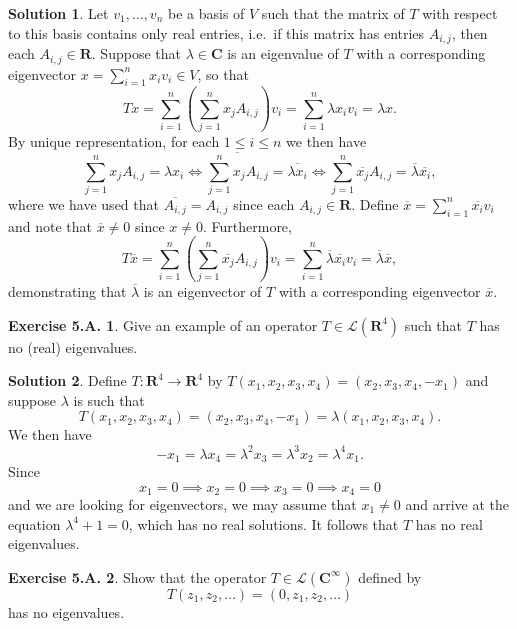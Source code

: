 \documentclass[12pt]{article}
\theoremstyle{definition}
\theoremstyle{exercise}
\newtheorem{exercise}{Exercise 5.A.}
\theoremstyle{solution}
\newtheorem*{solution}{Solution}
\newcommand{\lmap}{\mathcal{L}}
\newcommand{\R}{\mathbf{R}}
\newcommand{\C}{\mathbf{C}}
\begin{document}
\begin{solution}
    Let \( v_1, \ldots, v_n \) be a basis of \( V \) such that the matrix of \( T \) with respect to this basis contains only real entries, i.e.\ if this matrix has entries \( A_{i,j} \), then each \( A_{i,j} \in \R \). Suppose that \( \lambda \in \C \) is an eigenvalue of \( T \) with a corresponding eigenvector \( x = \sum_{i=1}^n x_i v_i \in V \), so that
    \[
        Tx = \sum_{i=1}^n \left( \sum_{j=1}^n x_j A_{i,j} \right) v_i = \sum_{i=1}^n \lambda x_i v_i = \lambda x.
    \]
    By unique representation, for each \( 1 \leq i \leq n \) we then have
    \[
        \sum_{j=1}^n x_j A_{i,j} = \lambda x_i \iff \overline{\sum_{j=1}^n x_j A_{i,j}} = \overline{\lambda x_i} \iff \sum_{j=1}^n \overline{x_j} A_{i,j} = \overline{\lambda} \overline{x_i},
    \]
    where we have used that \( \overline{A_{i,j}} = A_{i,j} \) since each \( A_{i,j} \in \R \). Define \( \overline{x} = \sum_{i=1}^n \overline{x_i} v_i \) and note that \( \overline{x} \neq 0 \) since \( x \neq 0 \). Furthermore,
    \[
        T \overline{x} = \sum_{i=1}^n \left( \sum_{j=1}^n \overline{x_j} A_{i,j} \right) v_i = \sum_{i=1}^n \overline{\lambda} \overline{x_i} v_i = \overline{\lambda} \overline{x},
    \]
    demonstrating that \( \overline{\lambda} \) is an eigenvector of \( T \) with a corresponding eigenvector \( \overline{x} \).
\end{solution}

\begin{exercise}
\label{ex:17}
    Give an example of an operator \( T \in \lmap(\R^4) \) such that \( T \) has no (real) eigenvalues.
\end{exercise}

\begin{solution}
    Define \( T : \R^4 \to \R^4 \) by \( T(x_1, x_2, x_3, x_4) = (x_2, x_3, x_4, -x_1) \) and suppose \( \lambda \) is such that
    \[
        T(x_1, x_2, x_3, x_4) = (x_2, x_3, x_4, -x_1) = \lambda(x_1, x_2, x_3, x_4).
    \]
    We then have
    \[
        -x_1 = \lambda x_4 = \lambda^2 x_3 = \lambda^3 x_2 = \lambda^4 x_1.
    \]
    Since
    \[
        x_1 = 0 \implies x_2 = 0 \implies x_3 = 0 \implies x_4 = 0
    \]
    and we are looking for eigenvectors, we may assume that \( x_1 \neq 0 \) and arrive at the equation \( \lambda^4 + 1 = 0 \), which has no real solutions. It follows that \( T \) has no real eigenvalues.
\end{solution}

\begin{exercise}
\label{ex:18}
    Show that the operator \( T \in \lmap(\C^{\infty}) \) defined by
    \[
        T(z_1, z_2, \ldots) = (0, z_1, z_2, \ldots)
    \]
    has no eigenvalues.
\end{exercise}
\end{document}
